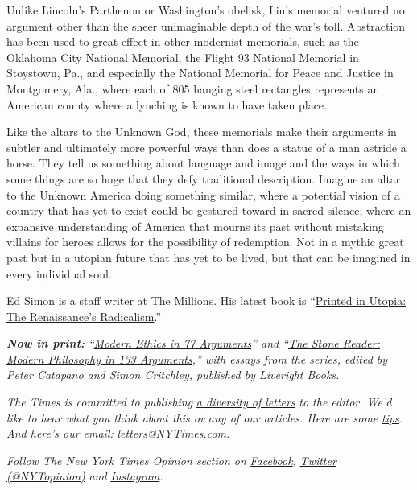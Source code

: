Unlike Lincoln's Parthenon or Washington's obelisk, Lin's memorial
ventured no argument other than the sheer unimaginable depth of the
war's toll. Abstraction has been used to great effect in other modernist
memorials, such as the Oklahoma City National Memorial, the Flight 93
National Memorial in Stoystown, Pa., and especially the National
Memorial for Peace and Justice in Montgomery, Ala., where each of 805
hanging steel rectangles represents an American county where a lynching
is known to have taken place.

Like the altars to the Unknown God, these memorials make their arguments
in subtler and ultimately more powerful ways than does a statue of a man
astride a horse. They tell us something about language and image and the
ways in which some things are so huge that they defy traditional
description. Imagine an altar to the Unknown America doing something
similar, where a potential vision of a country that has yet to exist
could be gestured toward in sacred silence; where an expansive
understanding of America that mourns its past without mistaking villains
for heroes allows for the possibility of redemption. Not in a mythic
great past but in a utopian future that has yet to be lived, but that
can be imagined in every individual soul.

Ed Simon is a staff writer at The Millions. His latest book is
``\href{https://www.johnhuntpublishing.com/zer0-books/our-books/printed-in-utopia}{Printed
in Utopia: The Renaissance's Radicalism}.''

\emph{\textbf{Now in print:}}
\emph{``}\href{http://bitly.com/1MW2kN3}{\emph{Modern Ethics in 77
Arguments}}\emph{'' and ``}\href{http://bitly.com/1MW2kN3}{\emph{The
Stone Reader: Modern Philosophy in 133 Arguments}}\emph{,'' with essays
from the series, edited by Peter Catapano and Simon Critchley, published
by Liveright Books.}

\emph{The Times is committed to publishing}
\href{https://www.nytimes3xbfgragh.onion/2019/01/31/opinion/letters/letters-to-editor-new-york-times-women.html}{\emph{a
diversity of letters}} \emph{to the editor. We'd like to hear what you
think about this or any of our articles. Here are some}
\href{https://help.nytimes3xbfgragh.onion/hc/en-us/articles/115014925288-How-to-submit-a-letter-to-the-editor}{\emph{tips}}\emph{.
And here's our email:}
\href{mailto:letters@NYTimes.com}{\emph{letters@NYTimes.com}}\emph{.}

\emph{Follow The New York Times Opinion section on}
\href{https://www.facebookcorewwwi.onion/nytopinion}{\emph{Facebook}}\emph{,}
\href{http://twitter.com/NYTOpinion}{\emph{Twitter (@NYTopinion)}}
\emph{and}
\href{https://www.instagram.com/nytopinion/}{\emph{Instagram}}\emph{.}

